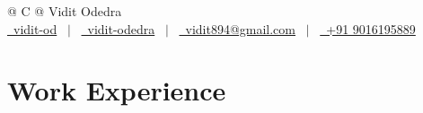 \documentclass[a4paper,12pt]{article}
\begin{document}
\pagestyle{empty}


\begin{tabularx}{\linewidth}{@{} C @{}}
\Huge{Vidit Odedra} \\[7.5pt]
\href{https://github.com/vidit-od}{\raisebox{-0.05\height}\faGithub\ vidit-od} \ $|$ \
\href{https://www.linkedin.com/in/vidit-odedra-02b342219/}{\raisebox{-0.05\height}\faLinkedin\ vidit-odedra} \ $|$ \
\href{mailto:vidit894@gmail.com}{\raisebox{-0.05\height}\faEnvelope\ vidit894@gmail.com} \ $|$ \
\href{tel:+91 9016195889}{\raisebox{-0.05\height}\faMobile\ +91 9016195889} \\
\end{tabularx}



\section{Work Experience}
\end{document}
